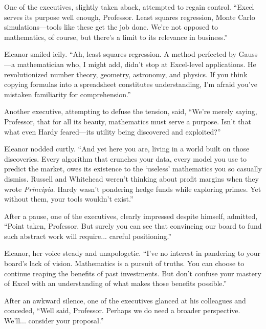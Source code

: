 \smallskip

One of the executives, slightly taken aback, attempted to regain control. “Excel serves its purpose well enough, Professor. Least squares regression, Monte Carlo simulations—tools like these get the job done. We’re not opposed to mathematics, of course, but there’s a limit to its relevance in business.”

\smallskip

Eleanor smiled icily. “Ah, least squares regression. A method perfected by Gauss—a mathematician who, I might add, didn’t stop at Excel-level applications. He revolutionized number theory, geometry, astronomy, and physics. If you think copying formulas into a spreadsheet constitutes understanding, I’m afraid you’ve mistaken familiarity for comprehension.”

\smallskip

Another executive, attempting to defuse the tension, said, “We’re merely saying, Professor, that for all its beauty, mathematics must serve a purpose. Isn’t that what even Hardy feared—its utility being discovered and exploited?”

\smallskip

Eleanor nodded curtly. “And yet here you are, living in a world built on those discoveries. Every algorithm that crunches your data, every model you use to predict the market, owes its existence to the ‘useless’ mathematics you so casually dismiss. Russell and Whitehead weren’t thinking about profit margins when they wrote \textit{Principia}. Hardy wasn’t pondering hedge funds while exploring primes. Yet without them, your tools wouldn’t exist.”

\smallskip

After a pause, one of the executives, clearly impressed despite himself, admitted, “Point taken, Professor. But surely you can see that convincing our board to fund such abstract work will require... careful positioning.”

\smallskip

Eleanor, her voice steady and unapologetic. “I’ve no interest in pandering to your board’s lack of vision. Mathematics is a pursuit of truths. You can choose to continue reaping the benefits of past investments. But don’t confuse your mastery of Excel with an understanding of what makes those benefits possible.”

\smallskip

After an awkward silence, one of the executives glanced at his colleagues and conceded, “Well said, Professor. Perhaps we do need a broader perspective. We’ll... consider your proposal.”

